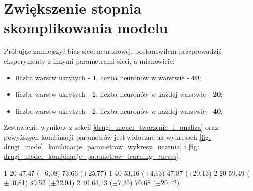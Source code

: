 \documentclass[12pt]{aghdpl}
\begin{document}
		\section{Zwiększenie stopnia skomplikowania modelu}
		Próbując zmniejszyć bias sieci neuronowej, postanowiłem przeprowadzić eksperymenty z innymi parametrami sieci, a mianowicie:
		\begin{itemize}
		\item liczba warstw ukrytych - \textbf{1}, liczba neuronów w warstwie - \textbf{40};
		\item liczba warstw ukrytych - \textbf{2}, liczba neuronów w każdej warstwie - \textbf{20};
		\item liczba warstw ukrytych - \textbf{2}, liczba neuronów w każdej warstwie - \textbf{40};
		\end{itemize}
		
		Zestawienie wynikow z sekcji \ref{drugi_model_tworzenie_i_analiza} oraz powyższych kombinacji parametrów jest widoczne na wykresach \ref{fig: drugi_model_kombinacje_parametrow_wykresy_uczenia} i \ref{fig: drugi_model_kombinacje_parametrow_learning_curves}.
		
1 20 47,47 ($\pm$6,08) 73,66 ($\pm$25,77)
1 40 53,16 ($\pm$4,93) 47,87 ($\pm$20,13)
2 20 59,49 ($\pm$10,81) 89,52 ($\pm$22,04)
2 40 64,13 ($\pm$7,30) 70,68 ($\pm$20,42)
		
\end{document}
